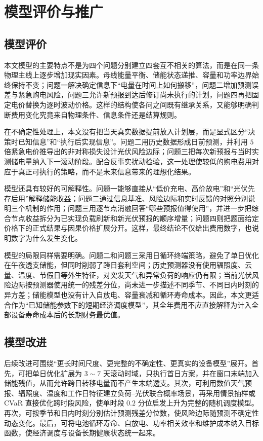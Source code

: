 \section{模型评价与推广}

\subsection{模型评价}

本文模型的主要特点不是为四个问题分别建立四套互不相关的算法，而是在同一条物理主线上逐步增加现实因素。母线能量平衡、储能状态递推、容量和功率边界始终保持不变；问题一解决确定信息下“电量在时间上如何搬移”，问题二增加预测误差与紧急购电风险，问题三允许新预报到达后修订尚未执行的计划，问题四再把固定电价替换为逐时波动价格。这样的结构使各问之间既有继承关系，又能够明确判断费用变化究竟来自物理条件、信息条件还是结算规则。

在不确定性处理上，本文没有把当天真实数据提前放入计划层，而是显式区分“决策时已知信息”和“执行后实现信息”。问题二用历史数据形成日前预测，并利用 $5$ 倍紧急电价推导出的非对称损失设计光伏风险边际；问题三把每次新预报与当时实测储电量纳入下一滚动阶段。配合反事实扰动检验，这一处理使较低的购电费用对应于真正可执行的策略，而不是未来信息带来的理想化结果。

模型还具有较好的可解释性。问题一能够直接从“低价充电、高价放电”和“光伏先存后用”解释储能收益；问题二通过信息基准、风险边际和实时反馈的对照分别说明三个机制的作用；问题三用逐节点消融回答“哪些预报值得使用”，并进一步把综合节点收益拆分为已实现负载刷新和新光伏预报的顺序增量；问题四则把题面给定价格下的正式结果与因果价格扩展分开。这样，最终结论不仅给出费用数字，也说明数字为什么发生变化。

模型的局限同样需要明确。问题二和问题三采用日循环终端策略，避免了单日优化在午夜透支储能，但同时削弱了跨日套利空间；历史预测器没有使用辐照度、云量、温度、节假日等外生特征，对突发天气和异常负荷的响应仍有限；当前光伏风险边际按预测器使用统一的残差分位，尚未进一步描述不同季节、不同日内时刻的异方差；储能模型也没有计入自放电、容量衰减和循环寿命成本。因此，本文更适合作为“已知储能参数下的短期经济调度模型”，其全年费用不应直接解释为计入全部设备寿命成本后的长期财务最优值。

\subsection{模型改进}
\label{sec:improve}

后续改进可围绕“更长时间尺度、更完整的不确定性、更真实的设备模型”展开。首先，可把单日优化扩展为 $3\sim7$ 天滚动时域，只执行首日方案，并在窗口末端加入储能残值，从而允许跨日转移电量而不产生末端透支。其次，可利用数值天气预报、辐照度、温度和工作日特征建立负荷--光伏联合概率场景，再采用情景抽样或 CVaR 直接优化跨时段风险，使单时段 $0.2$ 分位启发上升为完整的随机调度模型。再次，可按季节和日内时刻分别估计预测残差分位数，使风险边际随预测不确定性动态变化。最后，可将电池循环寿命、自放电、功率相关效率和维护成本纳入目标函数，使经济调度与设备长期健康状态统一起来。

